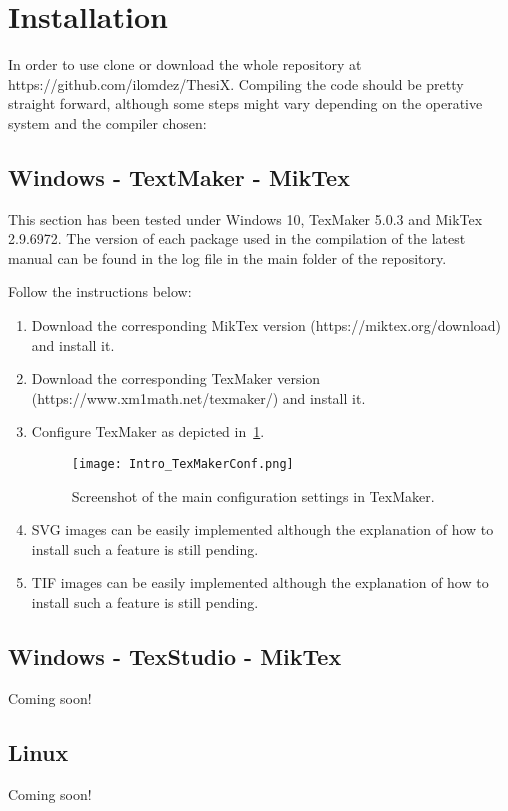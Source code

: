 \section{Installation} %
In order to use \ThesiX{} clone or download the whole repository at https://github.com/ilomdez/ThesiX. Compiling the code should be pretty straight forward, although some steps might vary depending on the operative system and the compiler chosen:

\subsection{Windows - TextMaker - MikTex}
This section has been tested under Windows 10, TexMaker 5.0.3 and MikTex 2.9.6972. The version of each package used in the compilation of the latest \ThesiX{} manual can be found in the log file in the main folder of the repository.

Follow the instructions below:
\begin{enumerate}
	\item Download the corresponding MikTex version (https://miktex.org/download) and install it.
	\item Download the corresponding TexMaker version (https://www.xm1math.net/texmaker/) and install it.
	\item Configure TexMaker as depicted in \fig\,\ref{fig:Intro_TexMakerConf}.

\begin{figure}[h]
    \centering
    \texttt{[image: Intro\_TexMakerConf.png]}
    \caption[Screenshot of the main configuration settings in TexMaker.]{Screenshot of the main configuration settings in TexMaker.}
    \label{fig:Intro_TexMakerConf}    
\end{figure}

	\item SVG images can be easily implemented although the explanation of how to install such a feature is still pending.
	\item TIF images can be easily implemented although the explanation of how to install such a feature is still pending.

\end{enumerate}


\subsection{Windows - TexStudio - MikTex}
Coming soon!

\subsection{Linux}
Coming soon!
